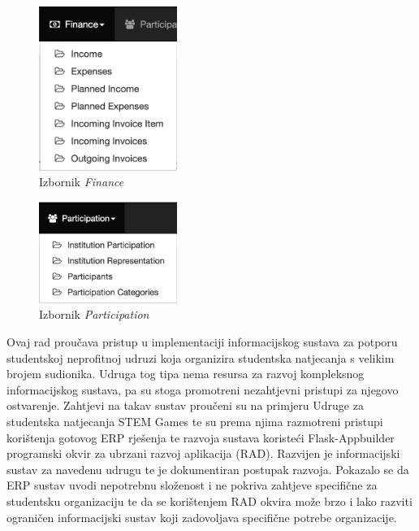 \documentclass[times, utf8, diplomski]{fer}
\begin{document}
\begin{figure}[H]
    \centering
    \includegraphics[width=0.4\textwidth]{slike/m4.png}
    \caption{Izbornik \emph{Finance}}
\end{figure}
\begin{figure}[H]
    \centering
    \includegraphics[width=0.4\textwidth]{slike/m5.png}
    \caption{Izbornik \emph{Participation}}
\end{figure}

\begin{sazetak}
Ovaj rad proučava pristup u implementaciji informacijskog sustava za potporu
studentskoj neprofitnoj udruzi koja organizira studentska natjecanja s velikim
brojem sudionika. Udruga tog tipa nema resursa za razvoj kompleksnog
informacijskog sustava, pa su stoga promotreni nezahtjevni pristupi za njegovo
ostvarenje. Zahtjevi na takav sustav proučeni su na primjeru Udruge za
studentska natjecanja STEM Games te su prema njima razmotreni pristupi korištenja gotovog
ERP rješenja te razvoja sustava koristeći Flask-Appbuilder programski
okvir za ubrzani razvoj aplikacija (RAD). Razvijen je informacijski sustav za navedenu
udrugu te je dokumentiran postupak razvoja. Pokazalo se da ERP sustav uvodi
nepotrebnu složenost i ne pokriva zahtjeve specifične za studentsku organizaciju
te da se korištenjem RAD okvira može brzo i lako razviti ograničen informacijski
sustav koji zadovoljava specifične potrebe organizacije.

\end{sazetak}
\end{document}
